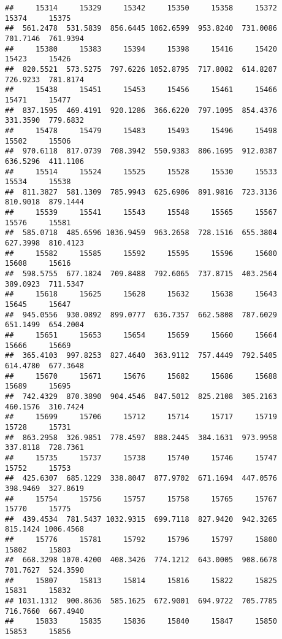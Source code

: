 \documentclass[
]{article}
\begin{document}
\begin{verbatim}
##     15314     15329     15342     15350     15358     15372     15374     15375 
##  561.2478  531.5839  856.6445 1062.6599  953.8240  731.0086  701.7146  761.9394 
##     15380     15383     15394     15398     15416     15420     15423     15426 
##  820.5521  573.5275  797.6226 1052.8795  717.8082  614.8207  726.9233  781.8174 
##     15438     15451     15453     15456     15461     15466     15471     15477 
##  837.1595  469.4191  920.1286  366.6220  797.1095  854.4376  331.3590  779.6832 
##     15478     15479     15483     15493     15496     15498     15502     15506 
##  970.6118  817.0739  708.3942  550.9383  806.1695  912.0387  636.5296  411.1106 
##     15514     15524     15525     15528     15530     15533     15534     15538 
##  811.3827  581.1309  785.9943  625.6906  891.9816  723.3136  810.9018  879.1444 
##     15539     15541     15543     15548     15565     15567     15576     15581 
##  585.0718  485.6596 1036.9459  963.2658  728.1516  655.3804  627.3998  810.4123 
##     15582     15585     15592     15595     15596     15600     15608     15616 
##  598.5755  677.1824  709.8488  792.6065  737.8715  403.2564  389.0923  711.5347 
##     15618     15625     15628     15632     15638     15643     15645     15647 
##  945.0556  930.0892  899.0777  636.7357  662.5808  787.6029  651.1499  654.2004 
##     15651     15653     15654     15659     15660     15664     15666     15669 
##  365.4103  997.8253  827.4640  363.9112  757.4449  792.5405  614.4780  677.3648 
##     15670     15671     15676     15682     15686     15688     15689     15695 
##  742.4329  870.3890  904.4546  847.5012  825.2108  305.2163  460.1576  310.7424 
##     15699     15706     15712     15714     15717     15719     15728     15731 
##  863.2958  326.9851  778.4597  888.2445  384.1631  973.9958  337.8118  728.7361 
##     15735     15737     15738     15740     15746     15747     15752     15753 
##  425.6307  685.1229  338.8047  877.9702  671.1694  447.0576  398.9469  327.8619 
##     15754     15756     15757     15758     15765     15767     15770     15775 
##  439.4534  781.5437 1032.9315  699.7118  827.9420  942.3265  815.1424 1006.4568 
##     15776     15781     15792     15796     15797     15800     15802     15803 
##  668.3298 1070.4200  408.3426  774.1212  643.0005  908.6678  701.7627  524.3590 
##     15807     15813     15814     15816     15822     15825     15831     15832 
## 1031.1312  900.8636  585.1625  672.9001  694.9722  705.7785  716.7660  667.4940 
##     15833     15835     15836     15840     15847     15850     15853     15856 

\end{verbatim}
\end{document}
